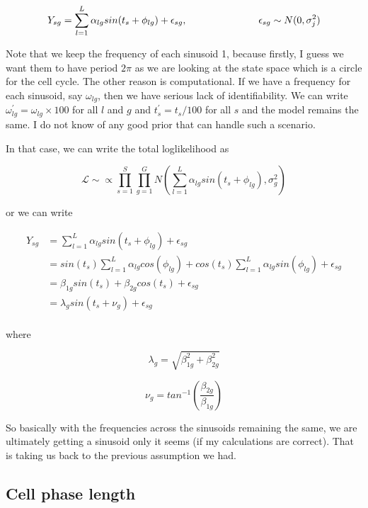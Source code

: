 \documentclass[11pt]{article}
\begin{document}
$$ Y_{sg} = \sum_{l=1}^{L} \alpha_{lg} sin (t_s + \phi_{lg})  +\epsilon_{sg}, \hspace{1 in}  \epsilon_{sg} \sim N(0, \sigma^2_j)  $$

Note that we keep the frequency of each sinusoid 1, because firstly, I guess we want them to have period $2 \pi$ as we are looking at the state space which is a circle for the cell cycle. The other reason is computational. If we have a frequency for each sinusoid, say $\omega_{lg}$, then we have serious lack of identifiability. We can write $\omega^{'}_{lg} = \omega_{lg} \times 100$ for all $l$ and $g$ and $t^{'}_s = t_s/100$ for all $s$ and the model remains the same. I do not know of any good prior that can handle such a scenario.

In that case, we can write the total loglikelihood as

$$ \mathcal{L} \sim  \propto \prod_{s=1}^{S} \prod_{g=1}^{G} N ( \sum_{l=1}^{L}  \alpha_{lg} sin (t_s + \phi_{lg}), \sigma^2_{g} ) $$

or we can write

\begin{align*}
Y_{sg}  & =  \sum_{l=1}^{L}  \alpha_{lg} sin (t_s + \phi_{lg}) + \epsilon_{sg}  \\
	    & = sin(t_s) \sum_{l=1}^{L} \alpha_{lg} cos(\phi_{lg}) + cos(t_s) \sum_{l=1}^{L} \alpha_{lg} sin(\phi_{lg}) + \epsilon_{sg}\\
	    & = \beta_{1g} sin(t_s) + \beta_{2g} cos(t_s)  + \epsilon_{sg}\\
	    & =  \lambda_g sin (t_s + \nu_g)  + \epsilon_{sg}\\
\end{align*}

where

$$ \lambda_{g} = \sqrt{\beta^2_{1g} +  \beta^2_{2g}} $$

$$ \nu_g = tan^{-1}  \left (\frac{\beta_{2g}}{\beta_{1g}} \right ) $$

So basically with the frequencies across the sinusoids remaining the same, we are ultimately getting a sinusoid only it seems (if my calculations are correct). That is taking us back to the previous assumption we had.

\subsection{Cell phase length}
\end{document}
